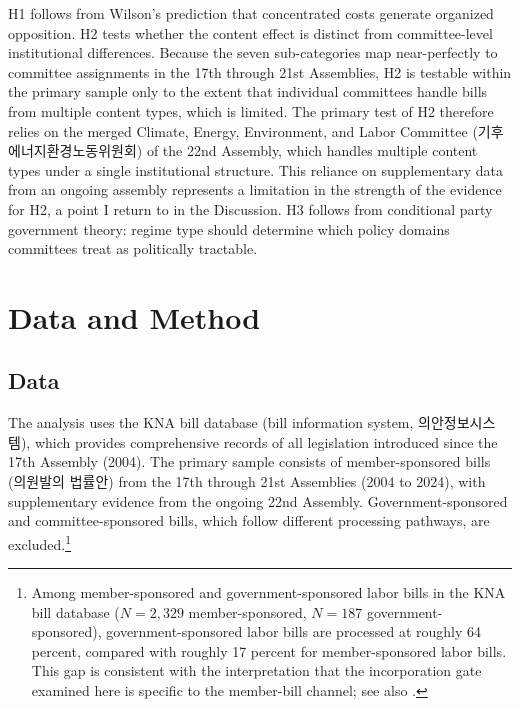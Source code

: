 \documentclass[11pt]{article}
\begin{document}
\medskip
\noindent H1 follows from Wilson's prediction that concentrated costs generate organized opposition. H2 tests whether the content effect is distinct from committee-level institutional differences. Because the seven sub-categories map near-perfectly to committee assignments in the 17th through 21st Assemblies, H2 is testable within the primary sample only to the extent that individual committees handle bills from multiple content types, which is limited. The primary test of H2 therefore relies on the merged Climate, Energy, Environment, and Labor Committee (기후에너지환경노동위원회) of the 22nd Assembly, which handles multiple content types under a single institutional structure. This reliance on supplementary data from an ongoing assembly represents a limitation in the strength of the evidence for H2, a point I return to in the Discussion. H3 follows from conditional party government theory: regime type should determine which policy domains committees treat as politically tractable.



\section{Data and Method}
\label{sec:method}

\subsection{Data}
\label{sec:data}

The analysis uses the KNA bill database (bill information system, 의안정보시스템), which provides comprehensive records of all legislation introduced since the 17th Assembly (2004). The primary sample consists of member-sponsored bills (의원발의 법률안) from the 17th through 21st Assemblies (2004 to 2024), with supplementary evidence from the ongoing 22nd Assembly. Government-sponsored and committee-sponsored bills, which follow different processing pathways, are excluded.\footnote{Among member-sponsored and government-sponsored labor bills in the KNA bill database ($N = 2{,}329$ member-sponsored, $N = 187$ government-sponsored), government-sponsored labor bills are processed at roughly 64 percent, compared with roughly 17 percent for member-sponsored labor bills. This gap is consistent with the interpretation that the incorporation gate examined here is specific to the member-bill channel; see also \citet{lee2021}.}
\end{document}
